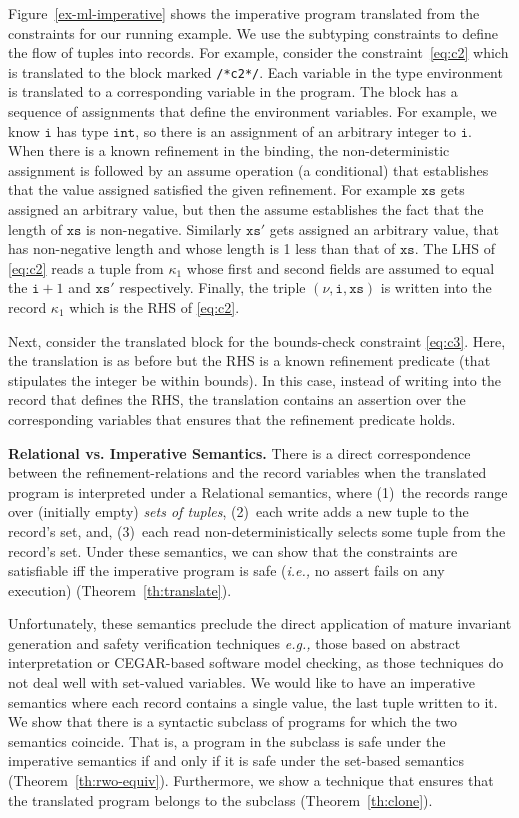 \documentclass[nocopyrightspace]{sigplanconf}
\def\mypara#1{\smallskip\noindent\textbf{#1}}
\newcommand{\ie}{\textit{i.e.,}\xspace}
\newcommand{\eg}{\textit{e.g.,}\xspace}
\newcommand{\ttxs}{\mathtt{xs}}
\newcommand{\ttxsp}{\mathtt{xs'}}
\newcommand{\tti}{\mathtt{i}}
\def\ttxs{\mathtt{xs}}
\def\valu{\nu}
\newcommand{\kvar}{\kappa}
\def\ttint{\mathtt{int}}
\def\rkvar{{\kvar}}
\def\RELSEM{{Relational}\xspace}
\def\IMPSEM{{Imperative}\xspace}
\begin{document}
Figure~\ref{ex-ml-imperative} shows the imperative program translated from
the constraints for our running example. 
We use the subtyping constraints to define the flow of tuples into records.
For example, consider the constraint~\eqref{eq:c2} which is translated
to the block marked \verb+/*c2*/+.
Each variable in the type environment is translated to a corresponding
variable in the program. 
The block has a sequence of assignments that define the environment
variables.
For example, we know $\tti$ has type $\ttint$, 
so there is an assignment of an arbitrary integer to $\tti$.
When there is a known refinement in the binding, the non-deterministic assignment is followed by an
assume operation (a conditional) that establishes that the value
assigned satisfied the given refinement.
For example $\ttxs$ gets assigned an arbitrary value, but then the assume
establishes the fact that the length of $\ttxs$ is non-negative.
Similarly $\ttxsp$ gets assigned an arbitrary value, that has non-negative
length and whose length is 1 less than that of $\ttxs$.
The LHS of \eqref{eq:c2} reads a tuple from $\rkvar_1$ whose first and
second fields are assumed to equal the ${\tti+1}$ and $\ttxsp$
respectively.
Finally, the triple $(\valu, \tti, \ttxs)$ is written into the record
$\rkvar_1$ which is the RHS of \eqref{eq:c2}.

Next, consider the translated block for the bounds-check constraint
\eqref{eq:c3}. Here, the translation is as before but the
RHS is a known refinement predicate (that stipulates the integer be within
bounds). In this case, instead of writing into the record that defines the
RHS, the translation contains an assertion over the corresponding variables
that ensures that the refinement predicate holds. 

\mypara{\RELSEM vs. \IMPSEM Semantics.}
There is a direct correspondence between the
refinement-relations and the record variables when the 
translated program is interpreted under a \RELSEM semantics,
where 
(1)~the records range over (initially empty) \emph{sets of tuples},
(2)~each write adds a new tuple to the record's set, and, 
(3)~each read non-deterministically selects some tuple from the record's set.
Under these semantics, we can show that the constraints 
are satisfiable iff the imperative program is safe (\ie no assert fails on any execution)
(Theorem~\ref{th:translate}).

Unfortunately, these semantics preclude the direct application of mature
invariant generation and safety verification techniques 
\eg those based on abstract interpretation or CEGAR-based 
software model checking, as those techniques 
do not deal well with set-valued variables.
We would like to have an imperative semantics where each record 
contains a single value, the last tuple written to it.
We show that there is a syntactic subclass of programs for which
the two semantics coincide. 
That is, a program in the subclass is safe under the imperative
semantics if and only if it is safe under the set-based semantics
(Theorem~\ref{th:rwo-equiv}).
Furthermore, we show a technique that ensures that the translated program
belongs to the subclass (Theorem~\ref{th:clone}).
\end{document}
